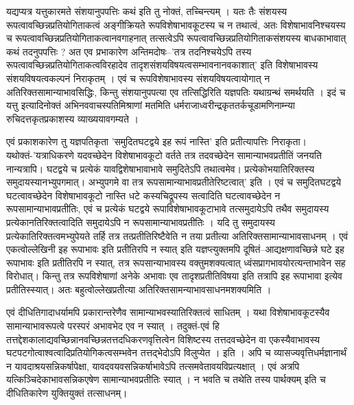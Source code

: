 यद्यप्यत्र यत्तुकारमते संशयानुपपत्तिः कथं इति तु नोक्तं, तच्चिन्त्यम् । यतः तैः संशयस्य रूपत्वावच्छिन्नप्रतियोगिताकत्वं अङ्गीक्रियते  रूपविशेषाभावकूटस्य च न तथात्वं, अतः विशेषाभावनिश्चयस्य च रूपत्वावच्छिन्नप्रतियोगिताकत्वानवगाहनात् तत्सत्वेऽपि रूपत्वावच्छिन्नप्रतियोगिताकसंशयस्य बाधकाभावात् कथं तदनुपपत्तिः ? अत एव प्रभाकारेण अन्तिमदोषः--’तत्र तदनिश्चयेऽपि तस्य रूपत्वावच्छिन्नप्रतियोगिताकत्वविरहादेव तादृशसंशयविषयत्वसम्भावनानवकाशात्’ इति विशेषाभावस्य संशयविषयत्वकल्पनं निराकृतम् । एवं च रूपविशेषाभावस्य संशयविषयत्वायोगात् न अतिरिक्तसामान्याभावसिद्धिः, किन्तु संशयानुपपत्या एव तत्सिद्धिरिति यज्ञपतिः यथाग्रन्थं समर्थयति । इदं च यत्तु इत्यादिनोक्तं अभिनववाचस्पतिमिश्राणां मतमिति धर्मराजाध्वरीन्द्रकृततर्कचूडामणिनाम्न्या रुचिदत्तकृतप्रकाशस्य व्याख्ययावगम्यते ।

एवं प्रकाशकारेण तु यज्ञपतिकृता ’समुदितघटद्वये इह रूपं नास्ति’ इति प्रतीत्यापत्तिः निराकृता। यथोक्तं-’यत्राधिकरणे यदवच्छेदेन विशेषाभावकूटो वर्तते तत्र तदवच्छेदेन सामान्याभवप्रतीतिं जनयति नान्यत्रापि। घटद्वये च प्रत्येकं यावद्विशेषाभावाभावे समुदितेऽपि तथात्वमेव। प्रत्येकोभयातिरिक्तस्य समुदायस्यानभ्युपगमात्। अभ्युपगमे वा तत्र रूपसामान्याभावप्रतीतेरिष्टत्वात्’ इति । एवं च समुदितघटद्वये घटत्वावच्छेदेन विशेषाभावकूटो नास्ति धटे कस्यचिद्रूपस्य सत्वादिति घटत्वावच्छेदेन न रूपसामान्याभावप्रतीतिः, एवं च प्रत्येकं घटद्वये रूपाविशेषाभावकूटाभावे तत्समुदायेऽपि तथैव समुदायस्य प्रत्येकानतिरिक्तत्वादिति समुदायेऽपि न रूपसामान्याभावप्रतीतिः । यदि तु  समुदायस्य प्रत्येकातिरिक्तत्वमभ्युपेयते तर्हि तत्र तत्प्रतीतिरिष्टैवेति न तया प्रतीत्या अतिरिक्तसामान्याभावसाधनम् । एवं एकत्वोल्लेखिनी इह रूपाभावः इति प्रतीतिरपि न स्यात् इति यज्ञप्त्युक्तमपि दूषितं–आद्यक्षणावच्छिन्ने घटे इह रूपाभावः इति प्रतीतिरपि न स्यात्, तत्र रूपसान्याभावस्य वक्तुमशक्यत्वात् ध्वंसप्रागभावयोरत्यन्ताभावेन सह विरोधात्। किन्तु तत्र रूपविशेषाणां अनेके  अभावाः एव तादृशप्रतीतिविषया इति तत्रापि इह रूपाभावा इत्येव प्रतीतिस्स्यात्। अतः बहुत्वोल्लेखप्रतीत्या अतिरिक्तसामन्याभावसाधनमशक्यमिति ।

एवं दीधितिगादाधर्यामपि प्रकारान्तरेणैव सामान्याभवस्यातिरिक्तत्वं साधितम् । यथा विशेषाभावकूटस्यैव सामान्याभावरूपत्वे परस्परं अभावभेद एव न स्यात् । तदुक्तं-एवं हि तत्तद्देशकालाद्यवच्छिन्नानवच्छिन्नतत्तदधिकरणवृत्तित्वेन विशिष्टस्य तत्तदवच्छेदेन वा एकस्यैवाभावस्य घटपटगोत्वाश्वत्वादिप्रतियोगिकत्वसम्भवेन तत्तद्भेदोऽपि विलुप्येत । इति । अपि च व्यासज्यवृत्तिधर्मज्ञानार्थं न यावदाश्रयसन्निकर्षापेक्षा, यावदवयवसन्निकर्षाभावेऽपि तत्समवेतावयविप्रत्यक्षात् । एवं अत्रपि यत्किञ्चिदेकाभावसन्निकएषेण सामान्याभवप्रतीतिः स्यात् । न भवति च तथेति तस्य पार्थक्यम् इति च दीधितिकारेण युक्तियुक्तं तत्साधनम्।

